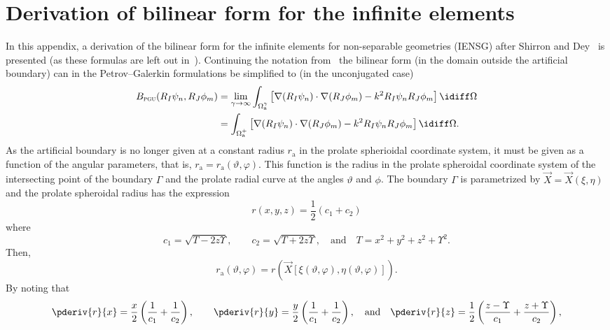 \section{Derivation of bilinear form for the infinite elements}
\label{Sec:AppendixDerivationOfBilinearForm}
In this appendix, a derivation of the bilinear form for the infinite elements for non-separable geometries (IENSG) after Shirron and Dey~\cite{Shirron2002aie} is presented (as these formulas are left out in~\cite{Shirron2002aie}). Continuing the notation from~\cite[Appendix A]{Venas2018iao} the bilinear form (in the domain outside the artificial boundary) can in the Petrov--Galerkin formulations be simplified to (in the unconjugated case)
\begin{align}\label{Eq:BilinearFormInserted}
	\begin{split}
	B_{\textsc{pgu}}(R_I\psi_n,R_J\phi_m) &= \lim_{\gamma\to\infty}\int_{\Omega_{\mathrm{a}}^\gamma} \left[\nabla(R_I\psi_n)\cdot \nabla (R_J\phi_m)- k^2 R_I\psi_n R_J\phi_m\right]\idiff\Omega\\
		&=\int_{\Omega_{\mathrm{a}}^+} \left[\nabla(R_I\psi_n)\cdot \nabla (R_J\phi_m)- k^2 R_I\psi_n R_J\phi_m\right]\idiff\Omega.
	\end{split}
\end{align}
As the artificial boundary is no longer given at a constant radius $r_{\mathrm{a}}$ in the prolate spherioidal coordinate system, it must be given as a function of the angular parameters, that is, $r_{\mathrm{a}} = r_{\mathrm{a}}(\vartheta,\varphi)$. This function is the radius in the prolate spheroidal coordinate system of the intersecting point of the boundary $\Gamma$ and the prolate radial curve at the angles $\vartheta$ and $\phi$. The boundary $\Gamma$ is parametrized by $\vec{X} = \vec{X}(\xi,\eta)$ and the prolate spheroidal radius has the expression
\begin{equation*}
	r(x,y,z) = \frac{1}{2}\left(c_1+c_2\right)
\end{equation*}
where
\begin{equation*}
	c_1 = \sqrt{T-2z\Upsilon},\qquad c_2 = \sqrt{T+2z\Upsilon},\quad\text{and}\quad T = x^2+y^2+z^2+\Upsilon^2.
\end{equation*}
Then,
\begin{equation*}
	r_{\mathrm{a}}(\vartheta,\varphi) = r\left(\vec{X}\left[\xi(\vartheta,\varphi),\eta(\vartheta,\varphi)\right]\right).
\end{equation*}
By noting that
\begin{equation*}
	\pderiv{r}{x} = \frac{x}{2}\left(\frac{1}{c_1}+\frac{1}{c_2}\right),\qquad\pderiv{r}{y} = \frac{y}{2}\left(\frac{1}{c_1}+\frac{1}{c_2}\right),\quad\text{and}\quad\pderiv{r}{z} = \frac{1}{2}\left(\frac{z-\Upsilon}{c_1}+\frac{z+\Upsilon}{c_2}\right),
\end{equation*}
